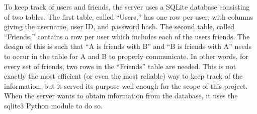 To keep track of users and friends, the server uses a SQLite database consisting of
two tables. The first table, called ``Users,'' has one row per user, with columns
giving the username, user ID, and password hash. The second table, called ``Friends,''
contains a row per user which includes each of the users friends. The design of this is such
that ``A is friends with B'' and ``B is friends with A'' needs to occur in the table
for A and B to properly communicate. In other words, for every set of friends, two rows
in the ``Friends'' table are needed. This is not exactly the most efficient (or even the
most reliable) way to keep track of the information, but it served its purpose well enough
for the scope of this project. When the server wants to obtain information from the
database, it uses the sqlite3 Python module to do so. 
